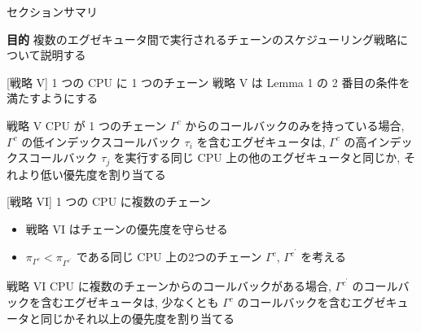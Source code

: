 \begin{frame}{セクションサマリ}
    \begin{itembox}[l]{\textbf{目的}}
        複数のエグゼキュータ間で実行されるチェーンのスケジューリング戦略について説明する
    \end{itembox}
\end{frame}


\begin{frame}{[戦略 V] 1 つの CPU に 1 つのチェーン}
    戦略 V は Lemma 1 の 2 番目の条件を満たすようにする
    \begin{block}{戦略 V}
        CPU が 1 つのチェーン $\Gamma^{c}$ からのコールバックのみを持っている場合, $\Gamma^{c}$ の低インデックスコールバック $\tau_{i}$ を含むエグゼキュータは, $\Gamma^{c}$ の高インデックスコールバック $\tau_{j}$ を実行する同じ CPU 上の他のエグゼキュータと同じか, それより低い優先度を割り当てる
    \end{block}
\end{frame}

\begin{frame}{[戦略 VI]  1 つの CPU に複数のチェーン}
    \begin{itemize}
        \item 戦略 VI はチェーンの優先度を守らせる
        \item $\pi_{\Gamma^{c}}<\pi_{\Gamma^{c^{\prime}}}$ である同じ CPU 上の2つのチェーン $\Gamma^{c}$, $\Gamma^{c^{\prime}}$ を考える
    \end{itemize}
    \begin{block}{戦略 VI}
        CPU に複数のチェーンからのコールバックがある場合, $\Gamma^{c^{\prime}}$ のコールバックを含むエグゼキュータは, 少なくとも $\Gamma^{c}$ のコールバックを含むエグゼキュータと同じかそれ以上の優先度を割り当てる
    \end{block}
\end{frame}


